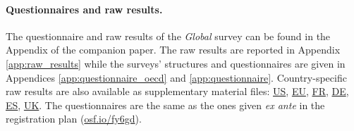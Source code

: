 \begin{small}
\paragraph{\small Questionnaires and raw results.} %
The questionnaire and raw results of the \textit{Global} survey can be found in the Appendix of the companion paper.\citep{dechezlepretre_fighting_2022} %
The raw results are reported in Appendix \ref{app:raw_results} while the surveys' structures and questionnaires are given in Appendices \ref{app:questionnaire_oecd} and \ref{app:questionnaire}. Country-specific raw results are also available as supplementary material files:  \href{https://github.com/bixiou/international_attitudes_toward_global_policies/raw/main/paper/app_desc_stats_US.pdf}{US}, \href{https://github.com/bixiou/international_attitudes_toward_global_policies/raw/main/paper/app_desc_stats_EU.pdf}{EU}, \href{https://github.com/bixiou/international_attitudes_toward_global_policies/raw/main/paper/app_desc_stats_FR.pdf}{FR}, \href{https://github.com/bixiou/international_attitudes_toward_global_policies/raw/main/paper/app_desc_stats_DE.pdf}{DE}, \href{https://github.com/bixiou/international_attitudes_toward_global_policies/raw/main/paper/app_desc_stats_ES.pdf}{ES}, \href{https://github.com/bixiou/international_attitudes_toward_global_policies/raw/main/paper/app_desc_stats_UK.pdf}{UK}. The questionnaires are the same as the ones given \textit{ex ante} in the registration plan (\href{https://osf.io/fy6gd}{osf.io/fy6gd}).



\end{small}
